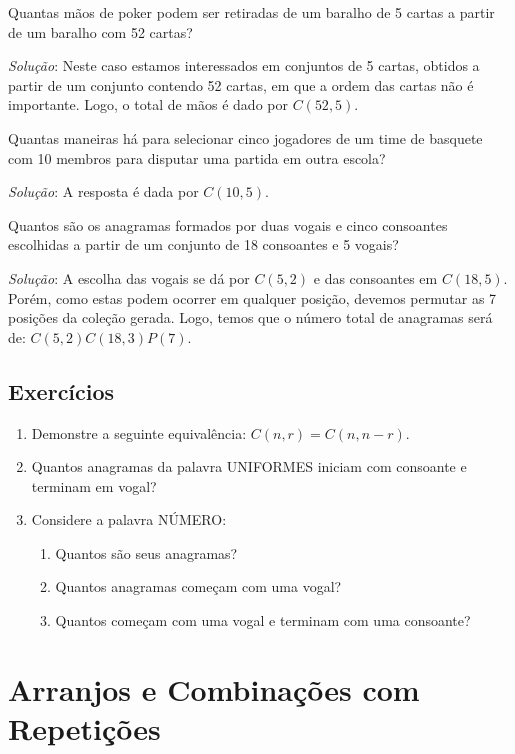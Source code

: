 \begin{Example}
Quantas mãos de poker podem ser retiradas de um baralho de 5 cartas a
partir de um baralho com 52 cartas?

\textit{Solução}: Neste caso estamos interessados em conjuntos de 5
cartas, obtidos a partir de um conjunto contendo 52 cartas, em que a
ordem das cartas não é importante. Logo, o total de mãos é dado por $C(52,5)$.
\end{Example}

\begin{Example}
Quantas maneiras há para selecionar cinco jogadores de um time de
basquete com 10 membros para disputar uma partida em outra escola?

\textit{Solução}: A resposta é dada por $C(10,5)$.
\end{Example}

\begin{Example}
  Quantos são os anagramas formados por duas vogais e cinco consoantes
  escolhidas a partir de um conjunto de 18 consoantes e 5 vogais?

\textit{Solução}: A escolha das vogais se dá por $C(5,2)$ e das
consoantes em $C(18,5)$. Porém, como estas podem ocorrer em qualquer
posição, devemos permutar as 7 posições da coleção gerada. Logo, temos
que o número total de anagramas será de: $C(5,2)C(18,3)P(7)$.
\end{Example}

\subsection{Exercícios}

\begin{enumerate}
  \item Demonstre a seguinte equivalência: $C(n,r) = C(n,n - r)$.
   \item Quantos anagramas da palavra UNIFORMES iniciam com consoante
     e terminam em vogal?
  \item Considere a palavra NÚMERO:
  \begin{enumerate}
    \item Quantos são seus anagramas?
    \item Quantos anagramas começam com uma vogal?
    \item Quantos começam com uma vogal e terminam com uma consoante?
  \end{enumerate}
\end{enumerate}

\section{Arranjos e Combinações com Repetições}


